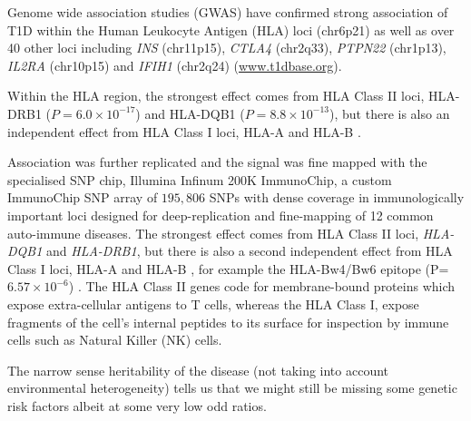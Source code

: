 Genome wide association studies (GWAS) have confirmed strong association of T1D within the Human Leukocyte Antigen (HLA) loci (chr6p21)
as well as over 40 other loci including \emph{INS} (chr11p15),
\emph{CTLA4} (chr2q33), \emph{PTPN22} (chr1p13), \emph{IL2RA} (chr10p15) and \emph{IFIH1} (chr2q24) \citep{Burton:2007hta,Barrett:2009jq} (\url{www.t1dbase.org}).

Within the HLA region, the strongest effect comes from HLA Class II loci, HLA-DRB1 ($P= 6.0 \times 10^{-17}$) and HLA-DQB1 ($P= 8.8 \times 10^{-13}$),
but there is also an independent effect from HLA Class I loci, HLA-A and HLA-B \citep{Howson:2009bl}.





Association was further replicated and the signal was fine mapped with the specialised SNP chip, Illumina Infinum 200K ImmunoChip, a custom ImmunoChip SNP array
of $195,806$ SNPs with dense coverage in immunologically important loci designed for deep-replication and fine-mapping of 12 common auto-immune diseases.
The strongest effect comes from HLA Class II loci, \emph{HLA-DQB1} and \emph{HLA-DRB1}, but there is also a second independent effect from HLA Class I loci, HLA-A and HLA-B \citep{Todd:2010bl}, for example the HLA-Bw4/Bw6 epitope (P=$6.57 \times 10^{-6}$) \citep{Nejentsev:2007dv}.
The HLA Class II genes code for membrane-bound proteins which expose extra-cellular antigens to T cells,
whereas the HLA Class I, expose fragments of the cell's internal peptides to its surface for inspection by immune cells such as Natural Killer (NK) cells.

The narrow sense heritability of the disease (not taking into account environmental heterogeneity) tells us that we might still be missing some genetic risk factors
albeit at some very low odd ratios.

